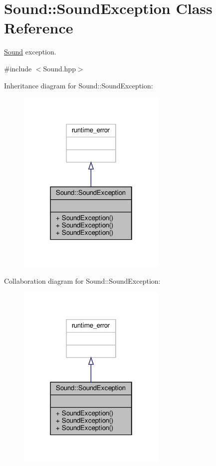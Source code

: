 \hypertarget{class_sound_1_1_sound_exception}{}\section{Sound\+:\+:Sound\+Exception Class Reference}
\label{class_sound_1_1_sound_exception}


\hyperlink{class_sound}{Sound} exception.  




{\ttfamily \#include $<$Sound.\+hpp$>$}



Inheritance diagram for Sound\+:\+:Sound\+Exception\+:
\nopagebreak
\begin{figure}[H]
\begin{center}
\leavevmode
\includegraphics[width=202pt]{class_sound_1_1_sound_exception__inherit__graph}
\end{center}
\end{figure}


Collaboration diagram for Sound\+:\+:Sound\+Exception\+:
\nopagebreak
\begin{figure}[H]
\begin{center}
\leavevmode
\includegraphics[width=202pt]{class_sound_1_1_sound_exception__coll__graph}
\end{center}
\end{figure}
